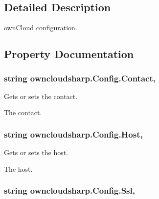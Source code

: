 \subsection{Detailed Description}
own\+Cloud configuration. 



\subsection{Property Documentation}
\hypertarget{classowncloudsharp_1_1_config_a11ba1d17f440c9ad512a2355ab1a5500}{}
\subsubsection[{Contact}]{\setlength{\rightskip}{0pt plus 5cm}string owncloudsharp.\+Config.\+Contact\hspace{0.3cm}{\ttfamily [get]}, {\ttfamily [set]}}\label{classowncloudsharp_1_1_config_a11ba1d17f440c9ad512a2355ab1a5500}


Gets or sets the contact. 

The contact.\hypertarget{classowncloudsharp_1_1_config_adf3604ef39a679dbaa980bf8d020d0a8}{}
\subsubsection[{Host}]{\setlength{\rightskip}{0pt plus 5cm}string owncloudsharp.\+Config.\+Host\hspace{0.3cm}{\ttfamily [get]}, {\ttfamily [set]}}\label{classowncloudsharp_1_1_config_adf3604ef39a679dbaa980bf8d020d0a8}


Gets or sets the host. 

The host.\hypertarget{classowncloudsharp_1_1_config_adbf71b12e814c4d8c6ae0f4de49099cf}{}
\subsubsection[{Ssl}]{\setlength{\rightskip}{0pt plus 5cm}string owncloudsharp.\+Config.\+Ssl\hspace{0.3cm}{\ttfamily [get]}, {\ttfamily [set]}}\label{classowncloudsharp_1_1_config_adbf71b12e814c4d8c6ae0f4de49099cf}



